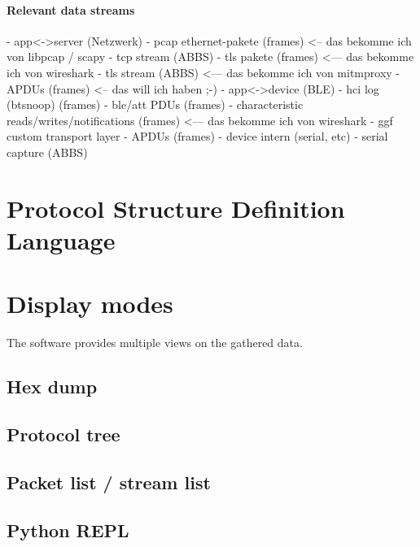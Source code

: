 \paragraph{Relevant data streams}

\begin{listing}
- app<->server (Netzwerk) 
  - pcap ethernet-pakete (frames)  <--  das bekomme ich von libpcap / scapy
    - tcp stream (ABBS)
      - tls pakete (frames)     <--- das bekomme ich von wireshark
        - tls stream (ABBS)   <--- das bekomme ich von mitmproxy
          - APDUs (frames)          <--  das will ich haben ;-)
- app<->device (BLE)
    - hci log (btsnoop)  (frames)
        - ble/att PDUs  (frames)
            - characteristic reads/writes/notifications (frames)  <--- das bekomme ich von wireshark
                - ggf custom transport layer
                  - APDUs (frames) 
- device intern (serial, etc)
    - serial capture (ABBS)
\end{listing}



\section{Protocol Structure Definition Language}



\section{Display modes}

The software provides multiple views on the gathered data.


\subsection{Hex dump}


\subsection{Protocol tree}


\subsection{Packet list / stream list}


\subsection{Python REPL}






